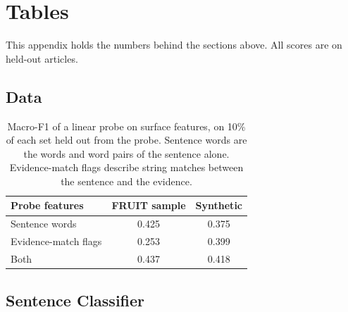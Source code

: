 \documentclass[]{paper}
\begin{document}



\clearpage
\setlength{\intextsep}{8pt plus 2pt minus 2pt}
\beginappendix{}

\section{Tables}
\label{app:tables}

This appendix holds the numbers behind the sections above. All scores are on held-out articles.

\subsection{Data}

\begin{table}[H]
\caption{Macro-F1 of a linear probe on surface features, on 10\% of each set held out from the probe. Sentence words are the words and word pairs of the sentence alone. Evidence-match flags describe string matches between the sentence and the evidence.}
\label{tab:probe}
\centering
\footnotesize
\begin{tabular}{lcc}
\toprule
Probe features & FRUIT sample & Synthetic \\
\midrule
Sentence words & 0.425 & 0.375 \\
Evidence-match flags & 0.253 & 0.399 \\
Both & 0.437 & 0.418 \\
\bottomrule
\end{tabular}
\end{table}

\subsection{Sentence Classifier}
\end{document}
